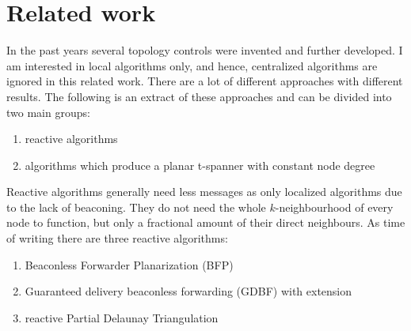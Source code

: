 

%



\section{Related work}

In the past years several topology controls were invented and further developed.
I am interested in local algorithms only, and hence, centralized algorithms are ignored in this related work.
There are a lot of different approaches with different results.
The following is an extract of these approaches and can be divided into two main groups:
\begin{enumerate}
\item reactive algorithms
\item algorithms which produce a planar t-spanner with constant node degree
\end{enumerate}

Reactive algorithms generally need less messages as only localized algorithms due to the lack of beaconing.
They do not need the whole $k $-neighbourhood of every node to function, but only a fractional amount of their direct neighbours.
As time of writing there are three reactive algorithms:
\begin{enumerate}
\item Beaconless Forwarder Planarization (BFP)
\item Guaranteed delivery beaconless forwarding (GDBF) with extension
\item reactive Partial Delaunay Triangulation
\end{enumerate}

